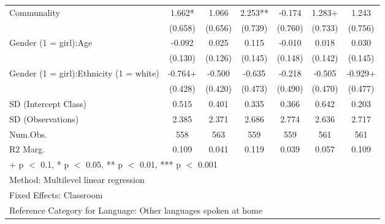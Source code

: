 \documentclass[
  letterpaper,
  DIV=11,
  numbers=noendperiod]{scrreprt}
\begin{document}
\begin{table}
\begin{tabular}[t]{lcccccc}
\hspace{1em}Communality & 1.662* & 1.066 & 2.253** & -0.174 & 1.283+ & 1.243\\
\hspace{1em} & (0.658) & (0.656) & (0.739) & (0.760) & (0.733) & (0.756)\\
\hspace{1em}Gender (1 = girl):Age & -0.092 & 0.025 & 0.115 & -0.010 & 0.018 & 0.030\\
\hspace{1em} & (0.130) & (0.126) & (0.145) & (0.148) & (0.142) & (0.145)\\
\hspace{1em}Gender (1 = girl):Ethnicity (1 = white) & -0.764+ & -0.500 & -0.635 & -0.218 & -0.505 & -0.929+\\
\hspace{1em} & (0.428) & (0.420) & (0.473) & (0.490) & (0.470) & (0.477)\\
\hspace{1em}SD (Intercept Class) & 0.515 & 0.401 & 0.335 & 0.366 & 0.642 & 0.203\\
\hspace{1em}SD (Observations) & 2.385 & 2.371 & 2.686 & 2.774 & 2.636 & 2.717\\
\hspace{1em}Num.Obs. & 558 & 563 & 559 & 559 & 561 & 561\\
\hspace{1em}R2 Marg. & 0.109 & 0.041 & 0.119 & 0.039 & 0.057 & 0.109\\
\bottomrule
\multicolumn{7}{l}{\rule{0pt}{1em}+ p $<$ 0.1, * p $<$ 0.05, ** p $<$ 0.01, *** p $<$ 0.001}\\
\multicolumn{7}{l}{\rule{0pt}{1em}Method: Multilevel linear regression}\\
\multicolumn{7}{l}{\rule{0pt}{1em}Fixed Effects: Classroom}\\
\multicolumn{7}{l}{\rule{0pt}{1em}Reference Category for Language: Other languages spoken at home}\\
\end{tabular}
\end{table}
\end{document}
